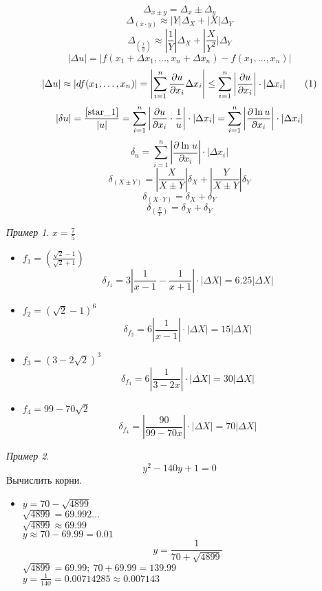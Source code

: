\documentclass[english]{article}
\newcommand\addtag{\refstepcounter{equation}\tag{\theequation}}
\theoremstyle{plain}
\theoremstyle{remark}
\newtheorem*{examp}{Пример}
\theoremstyle{definition}
\begin{document}
\[ \Delta_{x \pm y} = \Delta_x \pm \Delta_y \]
\[ \Delta_{(x\cdot y)} \approx |Y|\Delta_X + |X|\Delta_Y \]
\[ \Delta_{(\frac{x}{y})} \approx \left|\frac{1}{Y}\right|\Delta_X + \left|\frac{X}{Y^2}|\Delta_Y \]
\[ |\Delta u| = |f(x_1 + \Delta x_1, \dots, x_n + \Delta x_n) - f(x_1, \dots, x_n)| \]
\[ |\Delta u| \approx |df(x_1, \dots, x_n)| = \left|\sum_{i=1}^n \frac{\partial u}{\partial x_i}\Delta x_i \right| \le \sum_{i = 1}^n\left|\frac{\partial u}{\partial x_i}\right|\cdot|\Delta x_i| \addtag\label{star_1} \]
\[ |\delta u| = \frac{\ref{star_1}}{|u|} = \sum_{i = 1}^n\left|\frac{\partial u}{\partial x_i}\cdot\frac{1}{u}\right|\cdot|\Delta x_i| = \sum_{i = 1}^n \left|\frac{\partial \ln u}{\partial x_i}\right|\cdot|\Delta x_i| \]
\[ \delta_u = \sum_{i = 1}^n \left|\frac{\partial \ln u}{\partial x_i}\right| \cdot |\Delta x_i| \]
\[ \delta_{(X \pm Y)} = \left|\frac{X}{X \pm Y}\right| \delta_X + \left|\frac{Y}{X \pm Y}\right|\delta_Y \]
\[ \delta_{(X\cdot Y)} = \delta_X + \delta_Y \]
\[ \delta_{(\frac{X}{Y})} = \delta_X + \delta_Y \]

\begin{examp}
\(x = \frac{7}{5}\)
\begin{itemize}
\item \(f_1 = \left(\frac{\sqrt{2} - 1}{\sqrt{2} + 1}\right)\) \\
\[ \delta_{f_1} = 3\left|\frac{1}{x - 1} - \frac{1}{x + 1}\right|\cdot|\Delta X| = 6.25|\Delta X| \]
\item \(f_2 = (\sqrt{2} - 1)^6\) \\
\[ \delta_{f_2} = 6\left|\frac{1}{x - 1}\right|\cdot|\Delta X| = 15|\Delta X| \]
\item \(f_3 = (3 - 2\sqrt{2})^3\)
\[ \delta_{f_3} = 6\left|\frac{1}{3 - 2x}\right|\cdot|\Delta X| = 30|\Delta X| \]
\item \(f_4 = 99 - 70\sqrt{2}\)
\[ \delta_{f_4} = \left|\frac{90}{99 - 70x}\right|\cdot|\Delta X| = 70|\Delta X| \]
\end{itemize}
\end{examp}

\begin{examp}
\[ y^2 - 140y + 1 = 0 \]
Вычислить корни.
\begin{itemize}
\item \(y = 70 - \sqrt{4899}\) \\
\(\sqrt{4899} = 69.992\dots\) \\
\(\sqrt{4899} \approx 69.99\) \\
\(y \approx 70 - 69.99 = 0.01\)
\[ y = \frac{1}{70 + \sqrt{4899}} \]
\(\sqrt{4899} = 69.99;\ 70 + 69.99 = 139.99\) \\
\(y = \frac{1}{140} = 0.00714285 \approx 0.007143\)
\end{itemize}
\end{examp}
\end{document}
